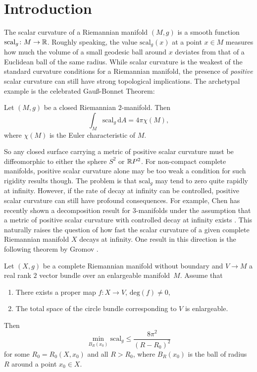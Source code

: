 \chapter*{Introduction}
{}
\label{chapter:intro}



The scalar curvature of a Riemannian manifold $(M,g)$ is a smooth function $\mathrm{scal}_g \colon M \to \mathbb{R}$. Roughly speaking, the value $\mathrm{scal}_g(x)$ at a point $x \in M$ measures how much the volume of a small geodesic ball around $x$ deviates from that of a Euclidean ball of the same radius. While scalar curvature is the weakest of the standard curvature conditions for a Riemannian manifold, the presence of \emph{positive} scalar curvature can still have strong topological implications. The archetypal example is the celebrated Gauß-Bonnet Theorem:

\begin{theorem*}
    Let $(M,g)$ be a closed Riemannian $2$-manifold. Then 
    \[
    \int_M \mathrm{scal}_g \, \mathrm{d}A = 4\pi\chi(M),
    \]
    where $\chi(M)$ is the Euler characteristic of $M$.
\end{theorem*}

So any closed surface carrying a metric of positive scalar curvature must be diffeomorphic to either the sphere $S^2$ or $\mathbb{R} P^2$. For non-compact complete manifolds, positive scalar curvature alone may be too weak a condition for such rigidity results though. The problem is that $\mathrm{scal}_g$ may tend to zero quite rapidly at infinity. However, if the rate of decay at infinity can be controlled, positive scalar curvature can still have profound consequences. For example, Chen has recently shown a decomposition result for $3$-manifolds under the assumption that a metric of positive scalar curvature with controlled decay at infinity exists \cite{chen2025optimaldecayconstantcomplete}. This naturally raises the question of how fast the scalar curvature of a given complete Riemannian manifold $X$ decays at infinity. One result in this direction is the following theorem by Gromov \cite[p. 15f.]{gromov2018metric}.

\begin{theorem*} \label{intro:thm:gromov_thm}
Let $(X,g)$ be a complete Riemannian manifold without boundary and $V \to M$ a real rank $2$ vector bundle over an enlargeable manifold~$M$. Assume that 
\begin{enumerate}[label=(\roman*)]
    \item There exists a proper map $f \colon X \to V$, $\mathrm{deg}(f) \neq 0$,
    \item \label{intro:eq:gromov_thm_condition_2}The total space of the circle bundle corresponding to $V$ is enlargeable.
\end{enumerate}
Then 
\[
\min_{B_R(x_0)} \mathrm{scal}_g \leq \frac{8 \pi^2}{(R-R_0)^2}
\]
for some $R_0 = R_0(X,x_0)$ and all $R > R_0$, where $B_R(x_0)$ is the ball of radius $R$ around a point $x_0 \in X$.
\end{theorem*}


